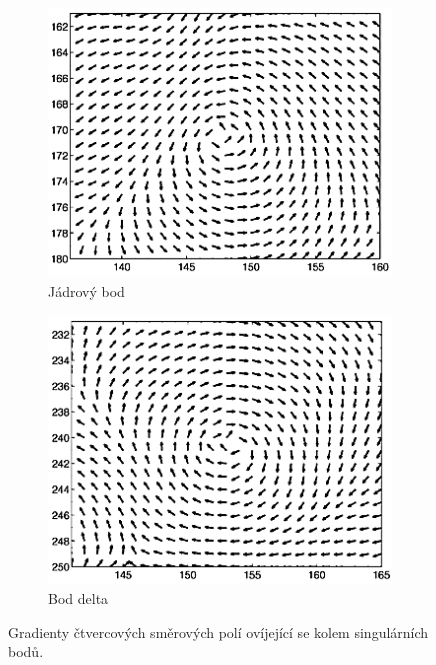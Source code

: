 \begin{figure}[h]\centering
    \centering
    \begin{subfigure}{0.45\textwidth}
    \includegraphics[width=0.9\linewidth]{obrazky-figures/gradient_table1.png}\hfill
    \caption{Jádrový bod}
    \end{subfigure}
    \begin{subfigure}{0.45\textwidth}
    \includegraphics[width=0.9\linewidth]{obrazky-figures/gradient_table2.png}\hfill
    \caption{Bod delta}
    \end{subfigure}
    \caption{Gradienty čtvercových směrových polí ovíjející se kolem singulárních bodů\protect\footnotemark{}.}
    \label{gradient_points}
\end{figure}


